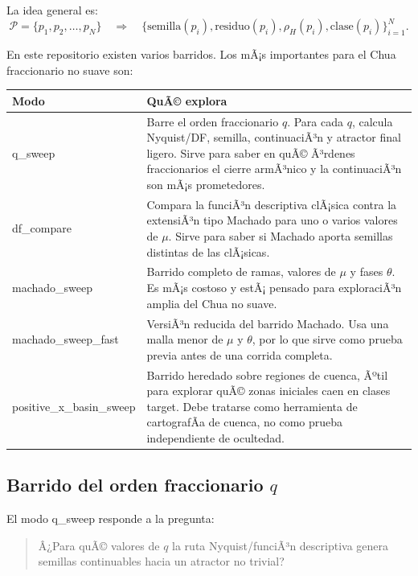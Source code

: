 \documentclass[11pt]{article}
\DeclareRobustCommand{\codepath}[1]{\begingroup\Urlmuskip=0mu plus 2mu\path{#1}\endgroup}
\def\codepath#1{#1}%
\begin{document}
La idea general es:
\begin{equation}
\mathcal P=\{p_1,p_2,\ldots,p_N\}
\quad\Longrightarrow\quad
\{\text{semilla}(p_i),\text{residuo}(p_i),\rho_H(p_i),\text{clase}(p_i)\}_{i=1}^N.
\end{equation}

En este repositorio existen varios barridos. Los mÃ¡s importantes para el Chua fraccionario no suave son:

\begin{center}
\small
\begin{tabular}{@{}L{0.27\textwidth}L{0.62\textwidth}@{}}
\toprule
Modo & QuÃ© explora\\
\midrule
\codepath{q_sweep} & Barre el orden fraccionario \(q\). Para cada \(q\), calcula Nyquist/DF, semilla, continuaciÃ³n y atractor final ligero. Sirve para saber en quÃ© Ã³rdenes fraccionarios el cierre armÃ³nico y la continuaciÃ³n son mÃ¡s prometedores.\\
\codepath{df_compare} & Compara la funciÃ³n descriptiva clÃ¡sica contra la extensiÃ³n tipo Machado para uno o varios valores de \(\mu\). Sirve para saber si Machado aporta semillas distintas de las clÃ¡sicas.\\
\codepath{machado_sweep} & Barrido completo de ramas, valores de \(\mu\) y fases \(\theta\). Es mÃ¡s costoso y estÃ¡ pensado para exploraciÃ³n amplia del Chua no suave.\\
\codepath{machado_sweep_fast} & VersiÃ³n reducida del barrido Machado. Usa una malla menor de \(\mu\) y \(\theta\), por lo que sirve como prueba previa antes de una corrida completa.\\
\codepath{positive_x_basin_sweep} & Barrido heredado sobre regiones de cuenca, Ãºtil para explorar quÃ© zonas iniciales caen en clases target. Debe tratarse como herramienta de cartografÃ­a de cuenca, no como prueba independiente de ocultedad.\\
\bottomrule
\end{tabular}
\end{center}

\subsection{Barrido del orden fraccionario \texorpdfstring{\(q\)}{q}}

El modo \codepath{q_sweep} responde a la pregunta:

\begin{quote}
Â¿Para quÃ© valores de \(q\) la ruta Nyquist/funciÃ³n descriptiva genera semillas continuables hacia un atractor no trivial?
\end{quote}
\end{document}
